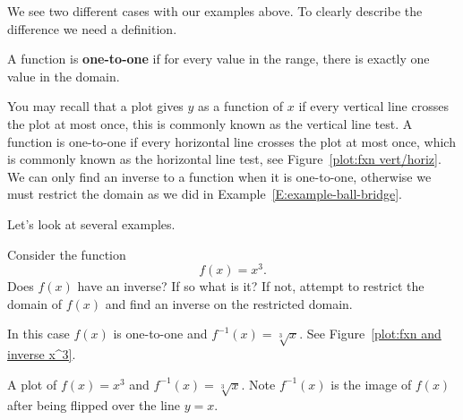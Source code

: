\documentclass{ximera}
\begin{document}
We see two different cases with our examples above. To clearly
describe the difference we need a definition.

\begin{definition} 
A function is \textbf{one-to-one} if for every value in the range,
there is exactly one value in the domain.
\end{definition}

You may recall that a plot gives $y$ as a function of $x$ if every
vertical line crosses the plot at most once, this is commonly known as
the vertical line test. A function is one-to-one if every horizontal
line crosses the plot at most once, which is commonly known as the
horizontal line test, see Figure~\ref{plot:fxn vert/horiz}.  We can
only find an inverse to a function when it is one-to-one, otherwise we
must restrict the domain as we did in
Example~\ref{E:example-ball-bridge}.


Let's look at several examples.



\begin{example}
Consider the function
\[
f(x) = x^3.
\]
Does $f(x)$ have an inverse? If so what is it? If not, attempt to
restrict the domain of $f(x)$ and find an inverse on the restricted
domain.
\end{example}


\begin{solution}
In this case $f(x)$ is one-to-one and $f^{-1}(x) = \sqrt[3]{x}$. See Figure~\ref{plot:fxn and inverse x^3}.
\end{solution}

\begin{marginfigure}[-2in]
\caption{A plot of $f(x)=x^3$ and $f^{-1}(x) = \sqrt[3]{x}$. Note
  $f^{-1}(x)$ is the image of $f(x)$ after being flipped over the line
  $y=x$.}
\label{plot:fxn and inverse x^3}
\end{marginfigure}
\end{document}

